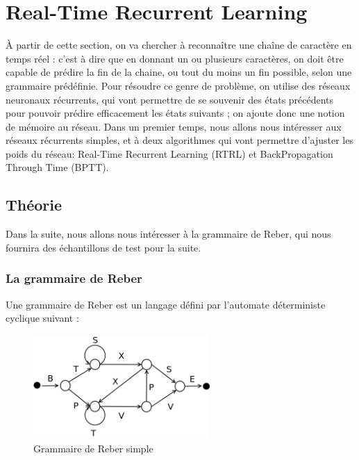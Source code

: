 
\chapter{Real-Time Recurrent Learning}

À partir de cette section, on va chercher à reconnaître une chaîne de caractère en temps réel : c'est à dire que en donnant un ou plusieurs caractères, on doit être capable de prédire la fin de la chaine, ou tout du moins un fin possible, selon une grammaire prédéfinie.
Pour résoudre ce genre de problème, on utilise des réseaux neuronaux récurrents, qui vont permettre de se souvenir des états précédents pour pouvoir prédire efficacement les états suivants ; on ajoute donc une notion de mémoire au réseau.
Dans un premier temps, nous allons nous intéresser aux réseaux récurrents simples, et à deux algorithmes qui vont permettre d'ajuster les poids du réseau: Real-Time Recurrent Learning (RTRL) et BackPropagation Through Time (BPTT).

\section{Théorie}

Dans la suite, nous allons nous intéresser à la grammaire de Reber, qui nous fournira des échantillons de test pour la suite.

\subsection{La grammaire de Reber}

Une grammaire de Reber est un langage défini par l'automate déterministe cyclique suivant :

\begin{figure}[!ht]
\begin{center}
\includegraphics[width=0.6\textwidth]{images/reberGrammar.png}
\end{center}
\caption{Grammaire de Reber simple}
\end{figure}


